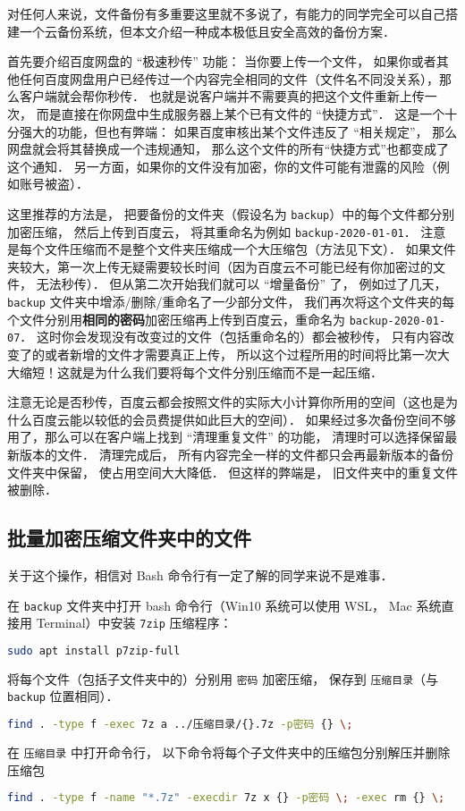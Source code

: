 
对任何人来说，文件备份有多重要这里就不多说了，有能力的同学完全可以自己搭建一个云备份系统，但本文介绍一种成本极低且安全高效的备份方案．

首先要介绍百度网盘的 “极速秒传” 功能： 当你要上传一个文件， 如果你或者其他任何百度网盘用户已经传过一个内容完全相同的文件（文件名不同没关系），那么客户端就会帮你秒传． 也就是说客户端并不需要真的把这个文件重新上传一次， 而是直接在你网盘中生成服务器上某个已有文件的 “快捷方式”． 这是一个十分强大的功能，但也有弊端： 如果百度审核出某个文件违反了 “相关规定”， 那么网盘就会将其替换成一个违规通知， 那么这个文件的所有“快捷方式”也都变成了这个通知． 另一方面，如果你的文件没有加密，你的文件可能有泄露的风险（例如账号被盗）．

这里推荐的方法是， 把要备份的文件夹（假设名为 \verb|backup|）中的每个文件都分别加密压缩， 然后上传到百度云， 将其重命名为例如 \verb|backup-2020-01-01|． 注意是每个文件压缩而不是整个文件夹压缩成一个大压缩包（方法见下文）． 如果文件夹较大，第一次上传无疑需要较长时间（因为百度云不可能已经有你加密过的文件， 无法秒传）． 但从第二次开始我们就可以 “增量备份” 了， 例如过了几天， \verb|backup| 文件夹中增添/删除/重命名了一少部分文件， 我们再次将这个文件夹的每个文件分别用\textbf{相同的密码}加密压缩再上传到百度云，重命名为 \verb|backup-2020-01-07|． 这时你会发现没有改变过的文件（包括重命名的）都会被秒传， 只有内容改变了的或者新增的文件才需要真正上传， 所以这个过程所用的时间将比第一次大大缩短！这就是为什么我们要将每个文件分别压缩而不是一起压缩．

注意无论是否秒传，百度云都会按照文件的实际大小计算你所用的空间（这也是为什么百度云能以较低的会员费提供如此巨大的空间）． 如果经过多次备份空间不够用了，那么可以在客户端上找到 “清理重复文件” 的功能， 清理时可以选择保留最新版本的文件． 清理完成后， 所有内容完全一样的文件都只会再最新版本的备份文件夹中保留， 使占用空间大大降低． 但这样的弊端是， 旧文件夹中的重复文件被删除．

\subsection{批量加密压缩文件夹中的文件}

关于这个操作，相信对 Bash 命令行有一定了解的同学来说不是难事．

在 \verb|backup| 文件夹中打开 bash 命令行（Win10 系统可以使用 WSL， Mac 系统直接用 Terminal）中安装 \verb|7zip| 压缩程序：
\begin{lstlisting}[language=bash]
sudo apt install p7zip-full
\end{lstlisting}
将每个文件（包括子文件夹中的）分别用 \verb|密码| 加密压缩， 保存到 \verb|压缩目录|（与 \verb|backup| 位置相同）．
\begin{lstlisting}[language=bash]
find . -type f -exec 7z a ../压缩目录/{}.7z -p密码 {} \;
\end{lstlisting}
在 \verb|压缩目录| 中打开命令行， 以下命令将每个子文件夹中的压缩包分别解压并删除压缩包
\begin{lstlisting}[language=bash]
find . -type f -name "*.7z" -execdir 7z x {} -p密码 \; -exec rm {} \;
\end{lstlisting}
